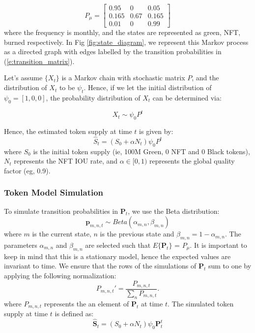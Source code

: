 \documentclass{article}
\begin{document}
\begin{equation}
P_{\mu} = 
\begin{bmatrix}
0.95 & 0  & 0.05 \\
0.165 & 0.67  & 0.165 \\
0.01 & 0 & 0.99
\end{bmatrix}
\label{e:transition_matrix}
\end{equation}
where the frequency is monthly, and the states are represented as green, NFT, burned respectively. In Fig \ref{fig:state_diagram}, we represent this Markov process as a directed graph with edges labelled by the transition probabilities in (\ref{e:transition_matrix}).

Let's assume $\{X_{t}\}$ is a Markov chain with stochastic matrix $P$, and the distribution of $X_{t}$ to be $\psi_{t}$. Hence, if we let the initial distribution of $\psi_{0} = [1,0,0]$, the probability distribution of $X_{t}$ can be determined via:

\begin{equation}
X_{t} \sim \psi_{0}P^{t}
\label{e:pow_vs_pos}
\end{equation}

Hence, the estimated token supply at time $t$ is given by:
\begin{equation}
\hat{S}_{t} = (S_{0} + \alpha N_{t})\psi_{0}P^{t}
\label{e:token_supply}
\end{equation}
where $S_{0}$ is the initial token supply (ie, 100M Green, 0 NFT and 0 Black tokens), $N_{t}$ represents the NFT IOU rate, and $\alpha \in [0,1)$ represents the global quality factor (eg, 0.9).

\subsubsection{Token Model Simulation}

To simulate transition probabilities in $\mathbf{P}_{t}$, we use the Beta distribution:
\begin{equation}
\mathbf{p}_{m,n,t} \sim Beta(\alpha_{m,n},\beta_{m,n})
\end{equation}
where $m$ is the current state, $n$ is the previous state and $\beta_{m,n} = 1-\alpha_{m,n}$. The parameters $\alpha_{m,n}$ and $\beta_{m,n}$ are selected such that $E\{\mathbf{P}_{t}\}$ = $P_{\mu}$. It is important to keep in mind that this is a stationary model, hence the expected values are invariant to time. We ensure that the rows of the simulations of $\mathbf{P}_{t}$ sum to one by applying the following normalization:
\begin{equation}
P_{m,n,t}'= \dfrac{P_{m,n,t} }{  \sum_{n} P_{m,n,t}  }.
\end{equation}
where $P_{m,n,t}$ represents the an element of $\mathbf{P}_{t}$ at time $t$. The simulated token supply  at time $t$ is defined as:
\begin{equation}
\hat{\mathbf{S}}_{t} =(S_{0} + \alpha N_{t})\psi_{0}\mathbf{P}_{t}^{t}
\label{e:token_supply_simulation}
\end{equation}
\end{document}
